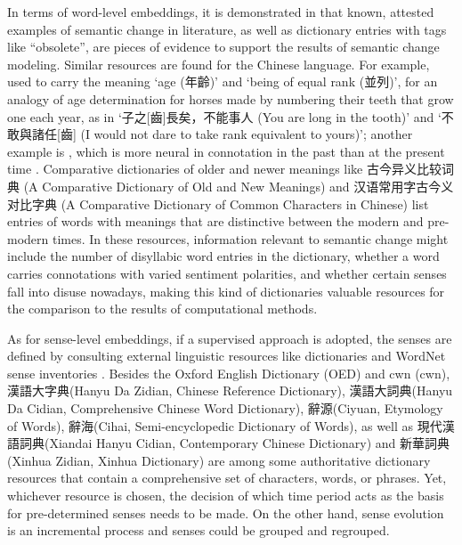 In terms of word-level embeddings, it is demonstrated in \textcite{hamilton2016law} that known, attested examples of semantic change in literature, as well as dictionary entries with tags like ``obsolete'', are pieces of evidence to support the results of semantic change modeling. Similar resources are found for the Chinese language. For example,  used to carry the meaning `age (年齡)' and `being of equal rank (並列)', for an analogy of age determination for horses made by numbering their teeth that grow one each year, as in `子之[齒]長矣，不能事人 (You are long in the tooth)' and `不敢與諸任[齒] (I would not dare to take rank equivalent to yours)'; another example is , which is more neural in connotation in the past than at the present time \parencite[前言]{wang1997gujinyiyi}. Comparative dictionaries of older and newer meanings like 古今异义比较词典 (A Comparative Dictionary of Old and New Meanings) \parencite{wang1997gujinyiyi} and 汉语常用字古今义对比字典 (A Comparative Dictionary of Common Characters in Chinese) \parencite{liu1992gujinyi} list entries of words with meanings that are distinctive between the modern and pre-modern times. In these resources, information relevant to semantic change might include the number of disyllabic word entries in the dictionary, whether a word carries connotations with varied sentiment polarities, and whether certain senses fall into disuse nowadays, making this kind of dictionaries valuable resources for the comparison to the results of computational methods.

As for sense-level embeddings, if a supervised approach is adopted, the senses are defined by consulting external linguistic resources like dictionaries and WordNet sense inventories \parencite{hu2019diachronic}. Besides the Oxford English Dictionary (OED) and \acrlong{cwn} (\acrshort{cwn}), 漢語大字典(Hanyu Da Zidian, Chinese Reference Dictionary), 漢語大詞典(Hanyu Da Cidian, Comprehensive Chinese Word Dictionary), 辭源(Ciyuan, Etymology of Words), 辭海(Cihai, Semi-encyclopedic Dictionary of Words), as well as 現代漢語詞典(Xiandai Hanyu Cidian, Contemporary Chinese Dictionary) and 新華詞典(Xinhua Zidian, Xinhua Dictionary) are among some authoritative dictionary resources that contain a comprehensive set of characters, words, or phrases. Yet, whichever resource is chosen, the decision of which time period acts as the basis for pre-determined senses needs to be made. On the other hand, sense evolution is an incremental process and senses could be grouped and regrouped.

